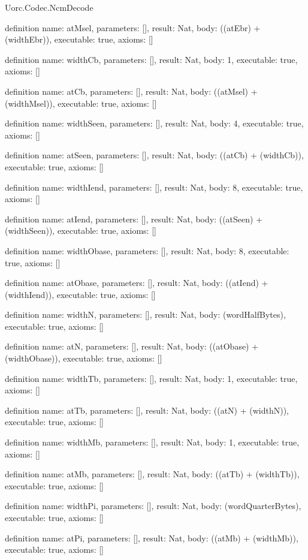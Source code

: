 \begin{lexlean}{Uorc.Codec.NcmDecode}
\begin{semanticmodule}
definition{
  name: atMsel,
  parameters: [],
  result: Nat,
  body: ((atEbr) + (widthEbr)),
  executable: true,
  axioms: []
}

definition{
  name: widthCb,
  parameters: [],
  result: Nat,
  body: 1,
  executable: true,
  axioms: []
}

definition{
  name: atCb,
  parameters: [],
  result: Nat,
  body: ((atMsel) + (widthMsel)),
  executable: true,
  axioms: []
}

definition{
  name: widthSeen,
  parameters: [],
  result: Nat,
  body: 4,
  executable: true,
  axioms: []
}

definition{
  name: atSeen,
  parameters: [],
  result: Nat,
  body: ((atCb) + (widthCb)),
  executable: true,
  axioms: []
}

definition{
  name: widthIend,
  parameters: [],
  result: Nat,
  body: 8,
  executable: true,
  axioms: []
}

definition{
  name: atIend,
  parameters: [],
  result: Nat,
  body: ((atSeen) + (widthSeen)),
  executable: true,
  axioms: []
}

definition{
  name: widthObase,
  parameters: [],
  result: Nat,
  body: 8,
  executable: true,
  axioms: []
}

definition{
  name: atObase,
  parameters: [],
  result: Nat,
  body: ((atIend) + (widthIend)),
  executable: true,
  axioms: []
}

definition{
  name: widthN,
  parameters: [],
  result: Nat,
  body: (wordHalfBytes),
  executable: true,
  axioms: []
}

definition{
  name: atN,
  parameters: [],
  result: Nat,
  body: ((atObase) + (widthObase)),
  executable: true,
  axioms: []
}

definition{
  name: widthTb,
  parameters: [],
  result: Nat,
  body: 1,
  executable: true,
  axioms: []
}

definition{
  name: atTb,
  parameters: [],
  result: Nat,
  body: ((atN) + (widthN)),
  executable: true,
  axioms: []
}

definition{
  name: widthMb,
  parameters: [],
  result: Nat,
  body: 1,
  executable: true,
  axioms: []
}

definition{
  name: atMb,
  parameters: [],
  result: Nat,
  body: ((atTb) + (widthTb)),
  executable: true,
  axioms: []
}

definition{
  name: widthPi,
  parameters: [],
  result: Nat,
  body: (wordQuarterBytes),
  executable: true,
  axioms: []
}

definition{
  name: atPi,
  parameters: [],
  result: Nat,
  body: ((atMb) + (widthMb)),
  executable: true,
  axioms: []
}


\end{semanticmodule}
\end{lexlean}
